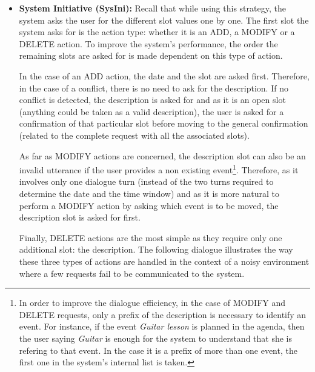       \begin{itemize}
          \item \textbf{System Initiative (SysIni):} Recall that while using this strategy, the system asks the user for the different slot values one by one. The first slot the system asks for is the action type: whether it is an ADD, a MODIFY or a DELETE action. To improve the system's performance, the order the remaining slots are asked for is made dependent on this type of action.
					
						In the case of an ADD action, the date and the slot are asked first. Therefore, in the case of a conflict, there is no need to ask for the description. If no conflict is detected, the description is asked for and as it is an open slot (anything could be taken as a valid description), the user is asked for a confirmation of that particular slot before moving to the general confirmation (related to the complete request with all the associated slots).
						
						As far as MODIFY actions are concerned, the description slot can also be an invalid utterance if the user provides a non existing event\footnote{In order to improve the dialogue efficiency, in the case of MODIFY and DELETE requests, only a prefix of the description is necessary to identify an event. For instance, if the event \textit{Guitar lesson} is planned in the agenda, then the user saying \textit{Guitar} is enough for the system to understand that she is refering to that event. In the case it is a prefix of more than one event, the first one in the system's internal list is taken.}. Therefore, as it involves only one dialogue turn (instead of the two turns required to determine the date and the time window) and as it is more natural to perform a MODIFY action by asking which event is to be moved, the description slot is asked for first.
						
						Finally, DELETE actions are the most simple as they require only one additional slot: the description. The following dialogue illustrates the way these three types of actions are handled in the context of a noisy environment where a few requests fail to be communicated to the system.
						

\end{itemize}
